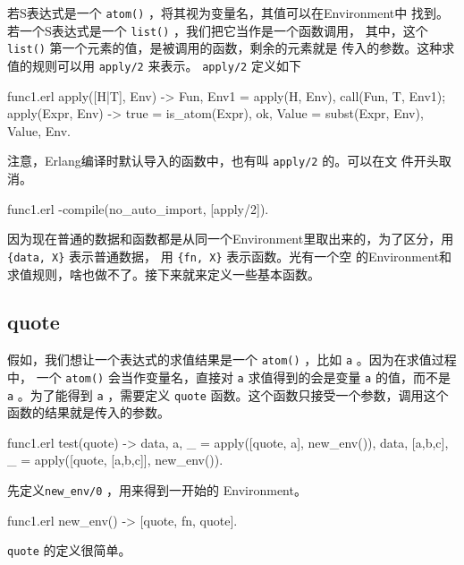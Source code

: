 \documentclass[preview,multi,crop=false,border=1in,class=memoir]{standalone}
\begin{document}
\begin{preview-page}
\nonzeroparskip

若S表达式是一个 \verb|atom()| ，将其视为变量名，其值可以在Environment中
找到。若一个S表达式是一个 \verb|list()| ，我们把它当作是一个函数调用，
其中，这个 \verb|list()| 第一个元素的值，是被调用的函数，剩余的元素就是
传入的参数。这种求值的规则可以用 \verb|apply/2| 来表示。
\verb|apply/2| 定义如下

\begin{SourceCode}[15][21]{func1.erl}
apply([H|T], Env) ->
    {Fun, Env1} = apply(H, Env),
    call(Fun, T, Env1);
apply(Expr, Env) ->
    true = is_atom(Expr),
    {ok, Value} = subst(Expr, Env),
    {Value, Env}.
\end{SourceCode}

注意，Erlang编译时默认导入的函数中，也有叫 \verb|apply/2| 的。可以在文
件开头取消。

\begin{SourceCode}[2][2]{func1.erl}
-compile({no_auto_import, [apply/2]}).
\end{SourceCode}

因为现在普通的数据和函数都是从同一个Environment里取出来的，为了区分，用
\verb|{data, X}| 表示普通数据， 用 \verb|{fn, X}| 表示函数。光有一个空
的Environment和求值规则，啥也做不了。接下来就来定义一些基本函数。

\subsection{quote}

假如，我们想让一个表达式的求值结果是一个 \verb|atom()| ，比如 \verb|a|
。因为在求值过程中， 一个 \verb|atom()| 会当作变量名，直接对 \verb|a|
求值得到的会是变量 \verb|a| 的值，而不是 \verb|a| 。为了能得到
\verb|a| ，需要定义 \verb|quote| 函数。这个函数只接受一个参数，调用这个
函数的结果就是传入的参数。

\begin{SourceCode}[36][40]{func1.erl}
test(quote) ->
    {{data, a}, _} =
        apply([quote, a], new_env()),
    {{data, [a,b,c]}, _} =
        apply([quote, [a,b,c]], new_env()).
\end{SourceCode}

先定义\verb|new_env/0| ，用来得到一开始的 Environment。

\begin{SourceCode}[28][29]{func1.erl}
new_env() ->
    [{quote, {fn, quote}}].
\end{SourceCode}

\verb|quote| 的定义很简单。


\end{preview-page}
\end{document}
